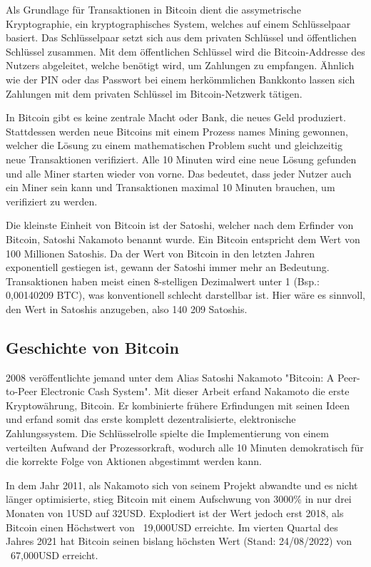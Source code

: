 Als Grundlage für Transaktionen in Bitcoin dient die assymetrische Kryptographie, ein kryptographisches System, welches auf
einem Schlüsselpaar basiert. Das Schlüsselpaar setzt sich aus dem privaten Schlüssel und öffentlichen Schlüssel zusammen. Mit 
dem öffentlichen Schlüssel wird die Bitcoin-Addresse des Nutzers abgeleitet, welche benötigt wird, um Zahlungen zu empfangen. 
Ähnlich wie der PIN oder das Passwort bei einem herkömmlichen Bankkonto lassen sich Zahlungen mit dem privaten Schlüssel 
im Bitcoin-Netzwerk tätigen.

In Bitcoin gibt es keine zentrale Macht oder Bank, die neues Geld produziert. Stattdessen werden neue Bitcoins mit einem Prozess
names Mining gewonnen, welcher die Lösung zu einem mathematischen Problem sucht und gleichzeitig neue Transaktionen verifiziert.
Alle 10 Minuten wird eine neue Lösung gefunden und alle Miner starten wieder von vorne. Das bedeutet, dass jeder Nutzer auch ein
Miner sein kann und Transaktionen maximal 10 Minuten brauchen, um verifiziert zu werden.

Die kleinste Einheit von Bitcoin ist der Satoshi, welcher nach dem Erfinder von Bitcoin, Satoshi Nakamoto benannt wurde. Ein 
Bitcoin entspricht dem Wert von 100 Millionen Satoshis. Da der Wert von Bitcoin in den letzten Jahren exponentiell gestiegen ist,
gewann der Satoshi immer mehr an Bedeutung. Transaktionen haben meist einen 8-stelligen Dezimalwert unter 1 (Bsp.: 0,00140209 BTC),
was konventionell schlecht darstellbar ist. Hier wäre es sinnvoll, den Wert in Satoshis anzugeben, also 140 209 Satoshis.


\subsection{Geschichte von Bitcoin}
2008 veröffentlichte jemand unter dem Alias Satoshi Nakamoto "Bitcoin: A Peer-to-Peer Electronic Cash System". 
Mit dieser Arbeit erfand Nakamoto die erste Kryptowährung, Bitcoin. Er kombinierte frühere Erfindungen mit seinen Ideen und 
erfand somit das erste komplett dezentralisierte, elektronische Zahlungssystem. Die Schlüsselrolle spielte die Implementierung 
von einem verteilten Aufwand der Prozessorkraft, wodurch alle 10 Minuten demokratisch für die korrekte Folge von Aktionen 
abgestimmt werden kann.

In dem Jahr 2011, als Nakamoto sich von seinem Projekt abwandte und es nicht länger optimisierte, stieg Bitcoin mit einem
Aufschwung von 3000\% in nur drei Monaten von 1USD auf 32USD. Explodiert ist der Wert jedoch erst 2018, als Bitcoin einen
Höchstwert von ~19,000USD erreichte. Im vierten Quartal des Jahres 2021 hat Bitcoin seinen bislang höchsten Wert (Stand: 24/08/2022)
von ~67,000USD erreicht.